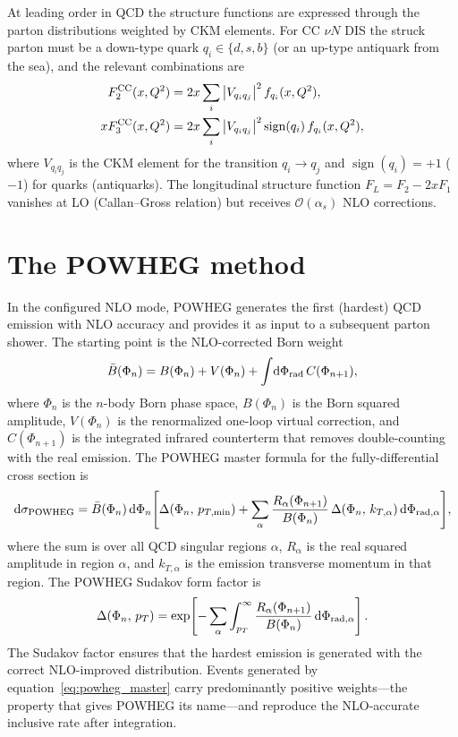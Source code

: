 \documentclass[11pt,a4paper]{report}
\numberwithin{equation}{chapter}
\newcommand{\dd}{\mathrm{d}}
\begin{document}
At leading order in QCD the structure functions are expressed through the
parton distributions weighted by CKM elements. For CC $\nu N$ DIS the struck
parton must be a down-type quark $q_i\in\{d,s,b\}$ (or an up-type antiquark
from the sea), and the relevant combinations are
\begin{align}
F_2^{\rm CC}(x,Q^2)
&= 2x\sum_i \left|V_{q_iq_j}\right|^2 f_{q_i}(x,Q^2),
\label{eq:F2}\\
xF_3^{\rm CC}(x,Q^2)
&= 2x\sum_i \left|V_{q_iq_j}\right|^2
   \operatorname{sign}(q_i)\,f_{q_i}(x,Q^2),
\label{eq:xF3}
\end{align}
where $V_{q_iq_j}$ is the CKM element for the transition $q_i\to q_j$ and
$\operatorname{sign}(q_i)=+1$ ($-1$) for quarks (antiquarks).
The longitudinal structure function $F_L = F_2 - 2xF_1$ vanishes at LO
(Callan--Gross relation) but receives $\mathcal{O}(\alpha_s)$ NLO corrections.

\section{The POWHEG method}

In the configured NLO mode, POWHEG generates the first (hardest) QCD emission
with NLO accuracy and provides it as input to a subsequent parton shower. The
starting point is the
NLO-corrected Born weight
\begin{equation}
\bar{B}(\Phi_n) = B(\Phi_n) + V(\Phi_n)
+ \int\!\dd\Phi_{\rm rad}\,C(\Phi_{n+1}),
\label{eq:powheg_bbar}
\end{equation}
where $\Phi_n$ is the $n$-body Born phase space, $B(\Phi_n)$ is the Born
squared amplitude, $V(\Phi_n)$ is the renormalized one-loop virtual
correction, and $C(\Phi_{n+1})$ is the integrated infrared counterterm
that removes double-counting with the real emission. The POWHEG master formula
for the fully-differential cross section is
\begin{equation}
\dd\sigma_{\rm POWHEG}
=
\bar{B}(\Phi_n)\,\dd\Phi_n
\Biggl[
\Delta(\Phi_n,\,p_{T,\min})
+\sum_\alpha
\frac{R_\alpha(\Phi_{n+1})}{B(\Phi_n)}\,
\Delta(\Phi_n,\,k_{T,\alpha})\,
\dd\Phi_{\rm rad,\alpha}
\Biggr],
\label{eq:powheg_master}
\end{equation}
where the sum is over all QCD singular regions $\alpha$, $R_\alpha$ is the
real squared amplitude in region $\alpha$, and $k_{T,\alpha}$ is the emission
transverse momentum in that region. The POWHEG Sudakov form factor is
\begin{equation}
\Delta(\Phi_n,\,p_T)
=
\exp\!\left[
-\sum_\alpha
\int_{p_T}^{\infty}
\frac{R_\alpha(\Phi_{n+1})}{B(\Phi_n)}
\,\dd\Phi_{\rm rad,\alpha}
\right].
\label{eq:powheg_sudakov}
\end{equation}
The Sudakov factor ensures that the hardest emission is generated with the
correct NLO-improved distribution. Events generated by
equation~\eqref{eq:powheg_master} carry predominantly positive weights---the
property that gives POWHEG its name---and reproduce the NLO-accurate inclusive
rate after integration.
\end{document}
